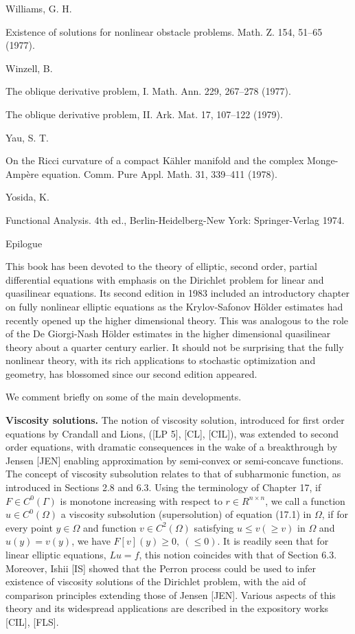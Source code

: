 \noindent Williams, G. H.

\noindent [WL]\quad Existence of solutions for nonlinear obstacle problems. Math. Z. 154, 51--65 (1977).

\noindent Winzell, B.

\noindent [WZ 1]\quad The oblique derivative problem, I. Math. Ann. 229, 267--278 (1977).

\noindent [WZ 2]\quad The oblique derivative problem, II. Ark. Mat. 17, 107--122 (1979).

\noindent Yau, S. T.

\noindent [YA]\quad On the Ricci curvature of a compact K\"ahler manifold and the complex Monge-Amp\`ere equation. Comm. Pure Appl. Math. 31, 339--411 (1978).

\noindent Yosida, K.

\noindent [YO]\quad Functional Analysis. 4th ed., Berlin-Heidelberg-New York: Springer-Verlag 1974.

\begin{center}
Epilogue
\end{center}

\noindent This book has been devoted to the theory of elliptic, second order, partial differential equations with emphasis on the Dirichlet problem for linear and quasilinear equations. Its second edition in 1983 included an introductory chapter on fully nonlinear elliptic equations as the Krylov-Safonov H\"older estimates had recently opened up the higher dimensional theory. This was analogous to the role of the De Giorgi-Nash H\"older estimates in the higher dimensional quasilinear theory about a quarter century earlier. It should not be surprising that the fully nonlinear theory, with its rich applications to stochastic optimization and geometry, has blossomed since our second edition appeared.

\noindent We comment briefly on some of the main developments.

\noindent \textbf{Viscosity solutions.} The notion of viscosity solution, introduced for first order equations by Crandall and Lions, ([LP 5], [CL], [CIL]), was extended to second order equations, with dramatic consequences in the wake of a breakthrough by Jensen [JEN] enabling approximation by semi-convex or semi-concave functions. The concept of viscosity subsolution relates to that of subharmonic function, as introduced in Sections 2.8 and 6.3. Using the terminology of Chapter 17, if $F \in C^0(\Gamma)$ is monotone increasing with respect to $r \in R^{n \times n}$, we call a function $u \in C^0(\Omega)$ a viscosity subsolution (supersolution) of equation (17.1) in $\Omega$, if for every point $y \in \Omega$ and function $v \in C^2(\Omega)$ satisfying $u \leq v (\geq v)$ in $\Omega$ and $u(y)=v(y)$, we have $F[v](y) \geq 0,\ (\leq 0)$. It is readily seen that for linear elliptic equations, $Lu = f$, this notion coincides with that of Section 6.3. Moreover, Ishii [IS] showed that the Perron process could be used to infer existence of viscosity solutions of the Dirichlet problem, with the aid of comparison principles extending those of Jensen [JEN]. Various aspects of this theory and its widespread applications are described in the expository works [CIL], [FLS].

